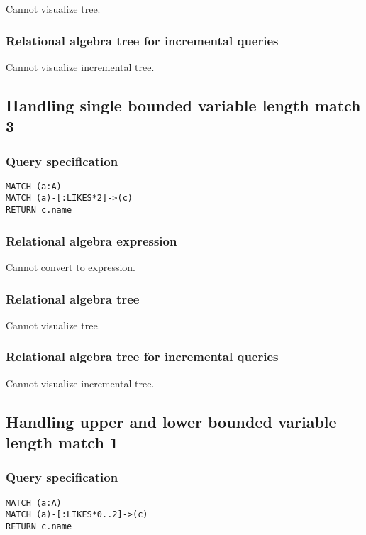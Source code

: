 Cannot visualize tree.

\subsubsection*{Relational algebra tree for incremental queries}

Cannot visualize incremental tree.

\subsection{Handling single bounded variable length match 3}

\subsubsection*{Query specification}

\begin{lstlisting}
MATCH (a:A)
MATCH (a)-[:LIKES*2]->(c)
RETURN c.name
\end{lstlisting}

\subsubsection*{Relational algebra expression}

Cannot convert to expression.

\subsubsection*{Relational algebra tree}

Cannot visualize tree.

\subsubsection*{Relational algebra tree for incremental queries}

Cannot visualize incremental tree.

\subsection{Handling upper and lower bounded variable length match 1}

\subsubsection*{Query specification}

\begin{lstlisting}
MATCH (a:A)
MATCH (a)-[:LIKES*0..2]->(c)
RETURN c.name
\end{lstlisting}

